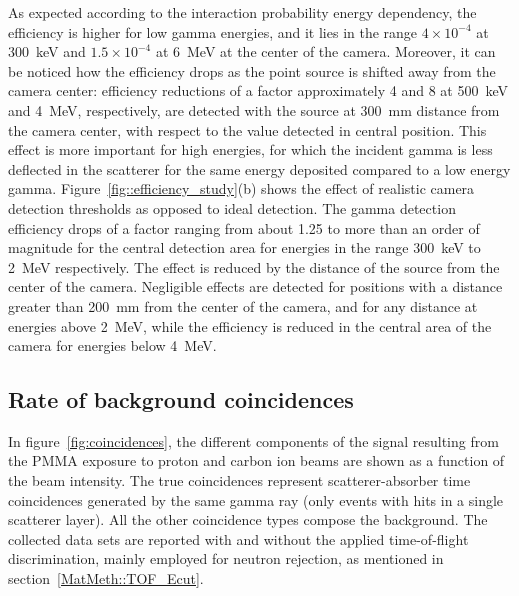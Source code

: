 As expected according to the interaction probability energy dependency, the efficiency is higher for low gamma energies, and it lies in the range $4\times10^{-4}$ at 300~keV and $1.5\times10^{-4}$ at 6~MeV at the center of the camera. Moreover, it can be noticed how the efficiency drops as the point source is shifted away from the camera center: efficiency reductions of a factor approximately 4 and 8 at 500~keV and 4~MeV, respectively, are detected with the source at 300~mm distance from the camera center, with respect to the value detected in central position. This effect is more important for high energies, for which the incident gamma is less deflected in the scatterer for the same energy deposited compared to a low energy gamma.   
Figure~\ref{fig::efficiency_study}(b) shows the effect of realistic camera detection thresholds as opposed to ideal detection. The gamma detection efficiency drops of a factor ranging from about 1.25 to more than an order of magnitude for the central detection area for energies in the range 300~keV to 2~MeV respectively. The effect is reduced by the distance of the source from the center of the camera. Negligible effects are detected for positions with a distance greater than 200~mm from the center of the camera, and for any distance at energies above 2~MeV, while the efficiency is reduced in the central area of the camera for energies below 4~MeV.\\
 
\subsection{Rate of background coincidences}
\label{Results::beamInt}
 
In figure~\ref{fig:coincidences}, the different components of the signal resulting from the PMMA exposure to proton and carbon ion beams are shown as a function of the beam intensity. The true coincidences represent scatterer-absorber time coincidences generated by the same gamma ray (only events with hits in a single scatterer layer). All the other coincidence types compose the background. The collected data sets are reported with and without the applied time-of-flight discrimination, mainly employed for neutron rejection, as mentioned in section~\ref{MatMeth::TOF_Ecut}.

